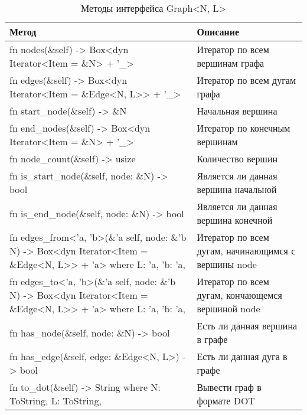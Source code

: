 \begin{table}
    \caption{Методы интерфейса Graph<N, L>}
    \label{class_GraphNL_api}
    \begin{tabular}{|m{20em}|m{20em}|}
        \hline
        \textbf{Метод} & \textbf{Описание}\\
        \hline
            fn nodes(\&self) -> Box<dyn Iterator<Item = \&N> + '\_> & Итератор по всем вершинам графа \\
        \hline
            fn edges(\&self) -> Box<dyn Iterator<Item = \&Edge<N, L>{}> + '\_> & Итератор по всем дугам графа \\
        \hline
            fn start\_node(\&self) -> \&N & Начальная вершина \\
        \hline
            fn end\_nodes(\&self) -> Box<dyn Iterator<Item = \&N> + '\_> & Итератор по конечным вершинам \\
        \hline
            fn node\_count(\&self) -> usize & Количество вершин \\
        \hline
            fn is\_start\_node(\&self, node: \&N) -> bool & Является ли данная вершина начальной \\
        \hline
            fn is\_end\_node(\&self, node: \&N) -> bool & Является ли данная вершина конечной \\
        \hline
            fn edges\_from<'a, 'b>(\&'a self, node: \&'b N) -> Box<dyn Iterator<Item = \&Edge<N, L>{}> + 'a> \newline 
            where L: 'a, 'b: 'a, & Итератор по всем дугам, начинающимся с вершины node \\
        \hline
            fn edges\_to<'a, 'b>(\&'a self, node: \&'b N) -> Box<dyn Iterator<Item = \&Edge<N, L>{}> + 'a> \newline 
            where L: 'a, 'b: 'a, & Итератор по всем дугам, кончающемся вершиной node\\
        \hline
            fn has\_node(\&self, node: \&N) -> bool & Есть ли данная вершина в графе \\
        \hline
            fn has\_edge(\&self, edge: \&Edge<N, L>) -> bool & Есть ли данная дуга в графе \\
        \hline
            fn to\_dot(\&self) -> String \newline where N: ToString, L: ToString, & Вывести граф в формате DOT \\
        \hline
    \end{tabular}
\end{table}

